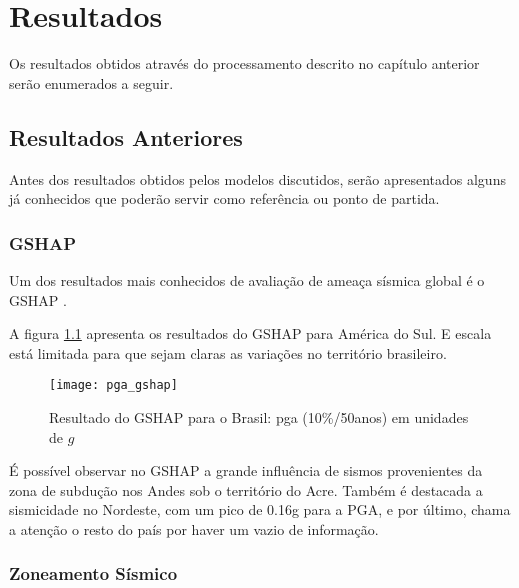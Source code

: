 \chapter{Resultados}
\label{cap:resultados}

Os resultados obtidos através do processamento descrito no capítulo anterior
serão enumerados a seguir.


\section{Resultados Anteriores}
\label{sec:old_results}

Antes dos resultados obtidos pelos modelos discutidos, 
serão apresentados alguns já conhecidos que poderão servir como referência ou ponto de partida.

\subsection{GSHAP}
\label{sec:gshap}

Um dos resultados mais conhecidos de avaliação de ameaça sísmica global é o GSHAP \citep{giardini_1999}.

A figura \ref{fig:gshap} apresenta os resultados do GSHAP para América do Sul.
E escala está limitada para que sejam claras as variações no território brasileiro.

\begin{figure}[H]
  \centering
  \texttt{[image: pga\_gshap]} 
  \caption{Resultado do GSHAP para o Brasil: \gls{pga} (10\%/50anos) em unidades de $g$}
  \label{fig:gshap} 
\end{figure}

É possível observar no GSHAP a grande influência de sismos provenientes da zona de subdução nos Andes 
sob o território do Acre. Também é destacada a sismicidade no Nordeste, com um pico de 0.16g para a PGA, e por
último, chama a atenção o resto do país por haver um vazio de informação.


\subsection{Zoneamento Sísmico}
\label{sec:zonning}

